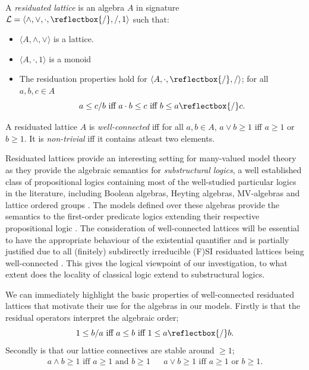 \documentclass{lmcs} %
\newcommand{\?}{\ensuremath{\mkern0.4\thinmuskip}}
\newcommand{\und}{\mathord{\reflectbox{/}}}%
\newcommand{\CL}{\mathcal{L}}
\begin{document}
\begin{defi}
    A \textit{residuated lattice} is an algebra $A$ in signature $\CL=\langle \land,\lor,\cdot,\und,/, 1\rangle$ such that:\begin{itemize}[nosep]
        \item $\langle A,\land,\lor\rangle$ is a lattice.
        \item $\langle A,\cdot,1\rangle$ is a monoid
        \item The residuation properties hold for $\langle A,\cdot,\und,/\rangle$; for all $a,b,c\in A$\[a\leq c/b\text{ iff }a\cdot b\leq c\text{ iff }b\leq a\und c.\]
    \end{itemize}
    A residuated lattice $A$ is \textit{well-connected} iff for all $a,b\in A$, $a\lor b\geq 1$ iff $a\geq 1$ or $b\geq 1$. It is \emph{non-trivial} iff it contains atleast two elements.  
\end{defi}

Residuated lattices provide an interesting setting for many-valued model theory as they provide the algebraic semantics for \textit{substructural logics}, a well established class of propositional logics containing most of the well-studied particular logics in the literature, including Boolean algebras, Heyting algebras, MV-algebras and lattice ordered groups \cite[Section 3.4]{GalatosJipsenKowalskiOno07:Resilattice,CintulaHajekNoguera11:Handbookvol1}. The models defined over these algebras provide the semantics to the first-order predicate logics extending their respective propositional logic \cite[Chapter 7]{CintulaNoguera21:LogicImplication}. The consideration of well-connected lattices will be essential to have the appropriate behaviour of the existential quantifier and is partially justified due to all (finitely) subdirectly irreducible (F)SI residuated lattices being well-connected \cite[Lemma 5.29]{GalatosJipsenKowalskiOno07:Resilattice}. This gives the logical viewpoint of our investigation, to what extent does the locality of classical logic extend to substructural logics. 

We can immediately highlight the basic properties of well-connected residuated lattices that motivate their use for the algebras in our models. Firstly is that the residual operators interpret the algebraic order; \[1\leq b/a\text{ iff }a\leq b\text{ iff }1\leq a\und b.\] Secondly is that our lattice connectives are stable around $\geq 1$; \begin{align*}
    a\land b\geq 1 \text{ iff } a\geq 1 \text{ and }b\geq 1 &&
    a\lor b\geq 1 \text{ iff }a\geq 1 \text{ or }b\geq 1.
\end{align*}
\end{document}
